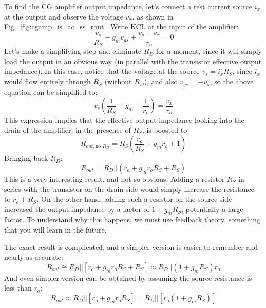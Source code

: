 To find the CG amplifier output impedance, let's connect a test current source $i_x$ at the output and observe the voltage $v_x$, as shown in Fig.~\ref{fig:cgamp_is_ac_ss_rout}.  Write KCL at the input of the amplifier:
% 
\begin{equation}
	\frac{{{v_s}}}{{{R_S}}} - {g_m}{v_{gs}} + \frac{{{v_s} - {v_x}}}{{{r_o}}} = 0
\end{equation}
%
Let's make a simplifying step and eliminate $R_D$ for a moment, since it will simply load the output in an obvious way (in parallel with the transistor effective output impedance).  In this case, notice that the voltage at the source $v_s = i_x R_S$, since $i_x$ would flow entirely through $R_S$ (without $R_D$), and also $v_{gs} = -v_s$, so the above equation can be simplified to:
%
\begin{equation}
	{v_s}\left( {\frac{1}{{{R_S}}} + {g_m} + \frac{1}{{{r_o}}}} \right) = \frac{{{v_x}}}{{{r_o}}}
\end{equation}
%
This expression implies that the effective output impedance looking into the drain of the amplifier, in the presence of $R_S$, is boosted to
%
\begin{equation}
	R_{out,\text{no $R_D$}} =  {{R_S}\left( {\frac{{{r_o}}}{{{R_S}}} + {g_m}{r_o} + 1} \right)} 
\end{equation}
%
Bringing back $R_D$:
%
\begin{equation}
	{R_{out}} = {R_D}||\left( {{r_o} + {g_m}{r_o}{R_S} + {R_S}} \right) 
\end{equation}
%
This is a very interesting result, and not so obvious.  Adding a resistor $R_S$ in series with the transistor on the drain side would simply increase the resistance to $r_o + R_S$.  On the other hand, adding such a resistor on the source side increased the output impedance by a factor of $1 + g_m R_S$, potentially a large factor.  To understand why this happens, we must use feedback theory, something that you will learn in the future.

The exact result is complicated, and a simpler version is easier to remember and nearly as accurate:
%
\begin{equation} 
	{R_{out}} \cong {R_D}||[{r_o} + {g_m}{r_o}{R_S} + {R_S}]  \approx R_D || (1 + g_m R_S) r_o
\end{equation}
%
And even simpler version can be obtained by assuming the source resistance is less than $r_o$:
% 
\begin{equation} 
{R_{out}} \approx {R_D}||[{r_o} + {g_m}{r_o}{R_S}] = {R_D}||[{r_o}(1 + {g_m}{R_S})]
\end{equation}




